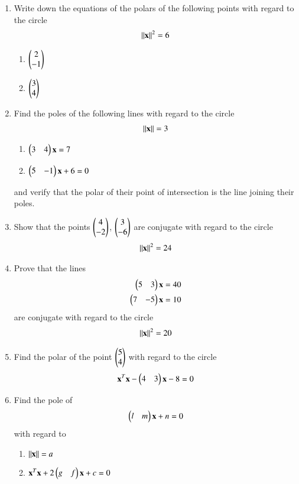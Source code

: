 \renewcommand{\theequation}{\theenumi}
\begin{enumerate}[label=\arabic*.,ref=\thesubsection.\theenumi]
\item Write down the equations of the polars of the following points with regard to the circle 
\begin{align}
\left\lVert\mathbf{x}\right\rVert^2=6
\end{align}

\begin{enumerate}
\item
$
\begin{pmatrix}2\\-1\end{pmatrix}
$
\item
$
\begin{pmatrix}3\\4\end{pmatrix}
$
\end{enumerate}
\item Find the poles of the following lines with regard to the circle 
\begin{align}
\left\lVert\mathbf{x}\right\rVert=3
\end{align}

\begin{enumerate}
\item
$
\begin{pmatrix}3 & 4\end{pmatrix}\mathbf{x}=7
$
\item
$
\begin{pmatrix}5 & -1\end{pmatrix}\mathbf{x}+6=0
$
\end{enumerate}
and verify that the polar of their point of intersection is the line joining their poles.
\item Show that the points $\begin{pmatrix}4\\-2\end{pmatrix}$, $\begin{pmatrix}3\\-6\end{pmatrix}$ are conjugate with regard to the circle
\begin{align}
\left\lVert\mathbf{x}\right\rVert^2=24
\end{align}
\item Prove that the lines 
\begin{align}
\begin{pmatrix}5 & 3\end{pmatrix}\mathbf{x}=40
\\
\begin{pmatrix}7 & -5\end{pmatrix}\mathbf{x}=10
\end{align}
are conjugate with regard to the circle
\begin{align}
\left\lVert\mathbf{x}\right\rVert^2=20
\end{align}
\item Find the polar of the point $\begin{pmatrix}5\\4\end{pmatrix}$ with regard to the circle
\begin{align}
\mathbf{x}^T\mathbf{x}-\begin{pmatrix}4 & 3\end{pmatrix}\mathbf{x}-8 = 0
\end{align}
\item Find the pole of 
\begin{align}
\begin{pmatrix}l & m\end{pmatrix}\mathbf{x}+n = 0
\end{align}
with regard to
\begin{enumerate}
\item
$
\left\lVert\mathbf{x}\right\rVert=a
$
\item
$
\mathbf{x}^T\mathbf{x}+2\begin{pmatrix}g & f\end{pmatrix}\mathbf{x}+c = 0
$


\end{enumerate}
\end{enumerate}
